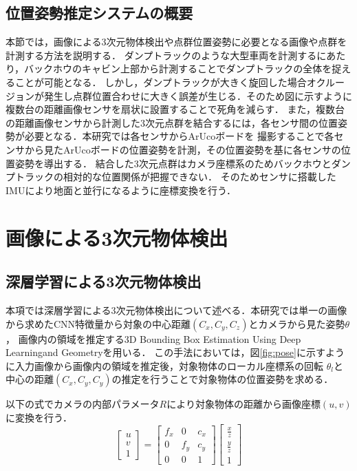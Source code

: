 \subsection{位置姿勢推定システムの概要}
本節では，画像による3次元物体検出や点群位置姿勢に必要となる画像や点群を計測する方法を説明する．
ダンプトラックのような大型車両を計測するにあたり，バックホウのキャビン上部から計測することでダンプトラックの全体を捉えることが可能となる．
しかし，ダンプトラックが大きく旋回した場合オクルージョンが発生し点群位置合わせに大きく誤差が生じる．そのため図に示すように複数台の距離画像センサを扇状に設置することで死角を減らす．
また，複数台の距離画像センサから計測した3次元点群を結合するには，各センサ間の位置姿勢が必要となる．本研究では各センサからArUcoボード\cite{Garrido2015}を
撮影することで各センサから見たArUcoボードの位置姿勢を計測，その位置姿勢を基に各センサの位置姿勢を導出する．
結合した3次元点群はカメラ座標系のためバックホウとダンプトラックの相対的な位置関係が把握できない．
そのためセンサに搭載したIMUにより地面と並行になるように座標変換を行う．
\newpage
\section{画像による3次元物体検出}
\subsection{深層学習による3次元物体検出}
本項では深層学習による3次元物体検出について述べる．本研究では単一の画像から求めたCNN特徴量から対象の中心距離$(C_x, C_y, C_z)$とカメラから見た姿勢$\theta$，
画像内の領域を推定する3D Bounding Box Estimation Using Deep Learningand Geometry\cite{2017}を用いる．
この手法においては，図\ref{fig:pose}に示すように入力画像から画像内の領域を推定後，対象物体のローカル座標系の回転 $\theta_l$と中心の距離$(C_x, C_y, C_y)$の推定を行うことで対象物体の位置姿勢を求める．

以下の式でカメラの内部パラメータ$R$により対象物体の距離から画像座標$(u, v)$に変換を行う．
\begin{equation}
\begin{bmatrix}u  \\v \\1 \end{bmatrix}
=\begin{bmatrix}f_x & 0 & c_x\\0 & f_y & c_y\\0 &0 &1 \end{bmatrix}
\begin{bmatrix}\frac{x}{z}  \\\frac{y}{z} \\1 \end{bmatrix}
\end{equation}


